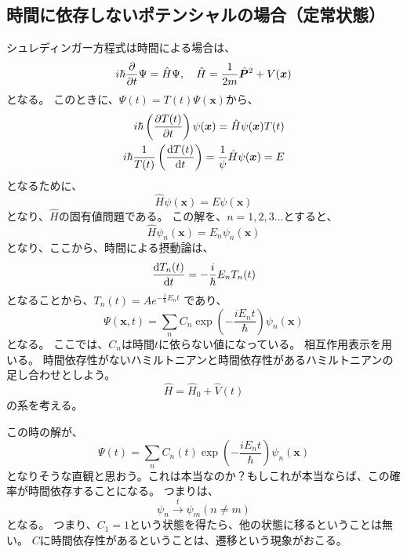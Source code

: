 \documentclass[titlepage]{ltjsarticle}
\begin{document}
\subsection*{時間に依存しないポテンシャルの場合（定常状態）}
シュレディンガー方程式は時間による場合は、
\begin{equation}
  i \hbar \pdv{}{t} \Psi = \hat{H} \Psi , \quad \hat{H} = \frac{1}{2m} \hat{\bm{P}}^2 + V(\bm{x})
\end{equation}
となる。
このときに、\(\Psi(t)=T(t)\Psi(\bm{x})\)から、
\begin{align}
  i \hbar \left( \pdv{T(t)}{t} \right) \psi(\bm{x}) = \hat{H} \psi(\bm{x}) T(t)\\
  i \hbar \frac{1}{T(t)} \left( \odv{T(t)}{t} \right) = \frac{1}{\psi} \hat{H} \psi(\bm{x}) = E
\end{align}
となるために、
\begin{equation}
  \hat{H} \psi(\bm{x}) = E \psi(\bm{x})
\end{equation}
となり、\(\hat{H}\)の固有値問題である。
この解を、\(n=1,2,3\ldots\)とすると、
\begin{equation}
  \hat{H} \psi_n(\bm{x}) = E_n \psi_n(\bm{x})
\end{equation}
となり、ここから、時間による摂動論は、
\begin{equation}
  \odv{T_n(t)}{t} = - \frac{i}{\hbar} E_n T_n(t)
\end{equation}
となることから、\(T_n(t) = A e^{-\frac{i}{\hbar}E_n t}\)
であり、
\begin{equation}
  \Psi(\bm{x},t) = \sum_n C_n \exp \left( -\frac{i E_n t}{\hbar} \right) \psi_n(\bm{x})
\end{equation}
となる。
ここでは、\(C_n\)は時間\(t\)に依らない値になっている。
相互作用表示を用いる。
時間依存性がないハミルトニアンと時間依存性があるハミルトニアンの足し合わせとしよう。
\begin{equation}
  \hat{H} = \hat{H}_0 + \hat{V}(t)
\end{equation}
の系を考える。

この時の解が、
\begin{equation}
\Psi(t) = \sum_n C_n(t) \exp \left( -\frac{i E_n t}{\hbar} \right) \psi_n(\bm{x})
\end{equation}
となりそうな直観と思おう。これは本当なのか？もしこれが本当ならば、この確率が時間依存することになる。
つまりは、
\begin{equation}
  \psi_n \xrightarrow{t} \psi_m (n\ne m)
\end{equation}
となる。
つまり、\(C_1=1\)という状態を得たら、他の状態に移るということは無い。
\(C\)に時間依存性があるということは、遷移という現象がおこる。
\end{document}
